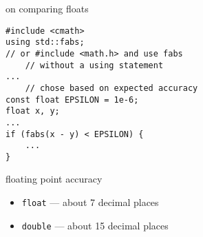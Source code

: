 \begin{frame}[fragile,label=onCompareFloats]{on comparing floats}
\lstset{
    language=C++,
    style=small
}
\begin{lstlisting}
#include <cmath>
using std::fabs;
// or #include <math.h> and use fabs
    // without a using statement
...
    // chose based on expected accuracy
const float EPSILON = 1e-6; 
float x, y;
...
if (fabs(x - y) < EPSILON) {
    ...
}
\end{lstlisting}
\end{frame}

\begin{frame}[fragile,label=floatAcc]{floating point accuracy}
\lstset{
    language=C++,
    style=small
}
    \begin{itemize}
    \item \texttt{float} --- about 7 decimal places
    \item \texttt{double} --- about 15 decimal places
    \end{itemize}
\end{frame}
